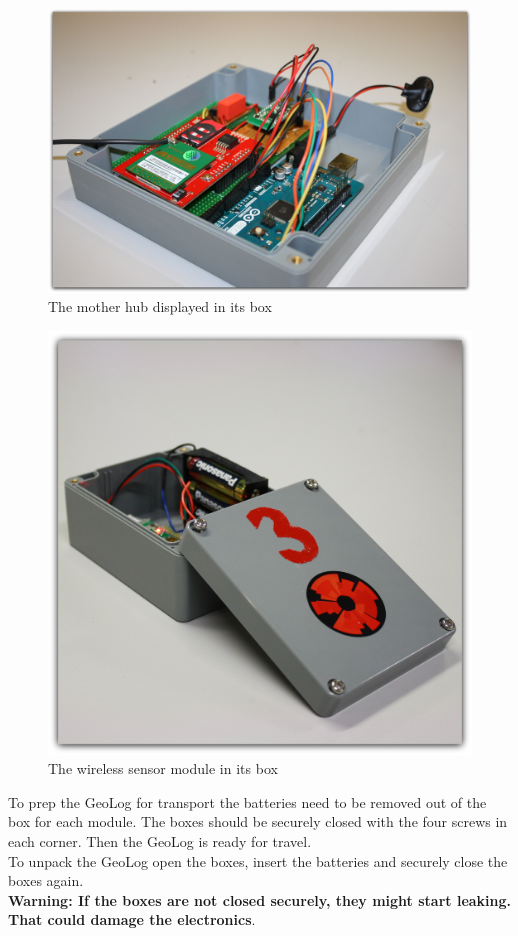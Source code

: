 \begin{figure}[H]
\centering
\includegraphics[width=0.6\linewidth]{graphics/Main_Open.jpg}
\caption{The mother hub displayed in its box\label{fig:Main_Open}}
\end{figure}
\begin{figure}[H]
\centering
\includegraphics[width=0.6\linewidth]{graphics/Wixel_sensor.jpg}
\caption{The wireless sensor module in its box\label{fig:Wixel_sensor}}
\end{figure}

To prep the GeoLog for transport the batteries need to be removed out of the box for each module. The boxes should be securely closed with the four screws in each corner. Then the GeoLog is ready for travel.\\
To unpack the GeoLog open the boxes, insert the batteries and securely close the boxes again.\\
\textbf{Warning: If the boxes are not closed securely, they might start leaking. That could damage the electronics}.

